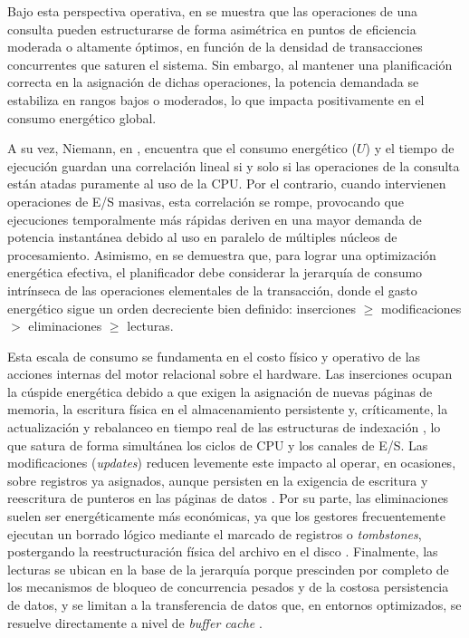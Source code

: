 \documentclass[12pt, letter paper]{report}
\begin{document}
      Bajo esta perspectiva operativa, en \cite{langtowards2012} se muestra que
      las operaciones de una consulta pueden estructurarse de forma asimétrica
      en puntos de eficiencia moderada o altamente óptimos, en función de la
      densidad de transacciones concurrentes que saturen el sistema. Sin
      embargo, al mantener una planificación correcta en la asignación de dichas
      operaciones, la potencia demandada se estabiliza en rangos bajos o
      moderados, lo que impacta positivamente en el consumo energético global.

      A su vez, Niemann, en \cite{niemanndoes2013}, encuentra que el consumo
      energético ($U$) y el tiempo de ejecución guardan una correlación lineal
      si y solo si las operaciones de la consulta están atadas puramente al uso
      de la CPU. Por el contrario, cuando intervienen operaciones de E/S
      masivas, esta correlación se rompe, provocando que ejecuciones
      temporalmente más rápidas deriven en una mayor demanda de potencia
      instantánea debido al uso en paralelo de múltiples núcleos de
      procesamiento. Asimismo, en \cite{niemannevaluating2013, 
      duarteevaluating2018} se demuestra que, para lograr una optimización
      energética efectiva, el planificador debe considerar la jerarquía de
      consumo intrínseca  de las operaciones elementales de la transacción,
      donde el gasto energético sigue un orden decreciente bien definido:
      inserciones $\ge$ modificaciones $>$ eliminaciones $\ge$ lecturas.

      Esta escala de consumo se fundamenta en el costo físico y operativo de las
      acciones internas del motor relacional sobre el hardware. Las inserciones
      ocupan la cúspide energética debido a que exigen la asignación de nuevas
      páginas de memoria, la escritura física en el almacenamiento persistente
      y, críticamente, la actualización y rebalanceo en tiempo real de las
      estructuras de indexación \cite{silberschatz2019database,
      elmasri2016fundamentals}, lo que satura de forma simultánea los ciclos de
      CPU y los canales de E/S. Las modificaciones (\textit{updates}) reducen
      levemente este impacto al operar, en ocasiones, sobre registros ya
      asignados, aunque persisten en la exigencia de escritura y reescritura de
      punteros en las páginas de datos \cite{connolly2014database}. Por su
      parte, las eliminaciones suelen ser energéticamente más económicas, ya que
      los gestores frecuentemente ejecutan un borrado lógico mediante el marcado
      de registros  o \textit{tombstones}, postergando la reestructuración
      física del archivo en el disco \cite{ramakrishnan2003database}.
      Finalmente, las lecturas  se ubican en la base de la jerarquía porque
      prescinden por completo de los mecanismos de bloqueo de concurrencia
      pesados y de la costosa persistencia de datos, y se limitan a la
      transferencia de datos que, en entornos optimizados, se resuelve
      directamente a nivel de \textit{buffer cache}
      \cite{silberschatz2019database, elmasri2016fundamentals,
      connolly2014database, ramakrishnan2003database}.
\end{document}
